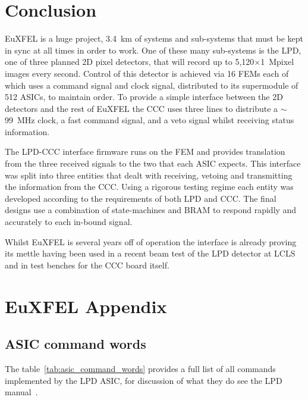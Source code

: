 \clearpage
\chapter{Conclusion} %
\label{cha:conclusion}
EuXFEL is a huge project, 3.4~km of systems and sub-systems that must be kept in sync at all times in order to work. One of these many sub-systems is the LPD, one of three planned 2D pixel detectors, that will record up to 5,120\( \times \)1~Mpixel images every second. Control of this detector is achieved via 16 FEMs each of which uses a command signal and clock signal, distributed to its supermodule of 512 ASICs, to maintain order. To provide a simple interface between the 2D detectors and the rest of EuXFEL the CCC uses three lines to distribute a \( \sim \)99~MHz clock, a fast command signal, and a veto signal whilst receiving status information. 

The LPD-CCC interface firmware runs on the FEM and provides translation from the three received signals to the two that each ASIC expects. This interface was split into three entities that dealt with receiving, vetoing and transmitting the information from the CCC. Using a rigorous testing regime each entity was developed according to the requirements of both LPD and CCC. The final designs use a combination of state-machines and BRAM to respond rapidly and accurately to each in-bound signal.

Whilst EuXFEL is several years off of operation the interface is already proving its mettle having been used in a recent beam test of the LPD detector at LCLS and in test benches for the CCC board itself.

\appendix
\chapter{EuXFEL Appendix} %
\label{cha:appendix}
\section{ASIC command words} %
\label{app:asic_command_words}
The table~\ref{tab:asic_command_words} provides a full list of all commands implemented by the LPD ASIC, for discussion of what they do see the LPD manual~\cite{lpd_manual}.

